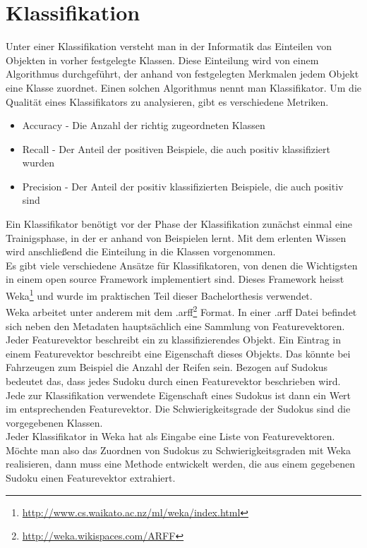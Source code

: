 \section{Klassifikation}
\label{Klassifikation}
Unter einer Klassifikation versteht man in der Informatik das Einteilen von Objekten in vorher festgelegte Klassen. Diese Einteilung wird von einem Algorithmus durchgeführt, der anhand von festgelegten Merkmalen jedem Objekt eine Klasse zuordnet. Einen solchen Algorithmus nennt man Klassifikator. Um die Qualität eines Klassifikators zu analysieren, gibt es verschiedene Metriken.
\begin{itemize}
\item Accuracy - Die Anzahl der richtig zugeordneten Klassen
\item Recall - Der Anteil der positiven Beispiele, die auch positiv klassifiziert wurden
\item Precision - Der Anteil der positiv klassifizierten Beispiele, die auch positiv sind
\end{itemize}
Ein Klassifikator benötigt vor der Phase der Klassifikation zunächst einmal eine Trainigsphase, in der er anhand von Beispielen lernt. Mit dem erlenten Wissen wird anschließend die Einteilung in die Klassen vorgenommen.\\
Es gibt viele verschiedene Ansätze für Klassifikatoren, von denen die Wichtigsten in einem open source Framework implementiert sind. Dieses Framework heisst Weka\footnote{\url{http://www.cs.waikato.ac.nz/ml/weka/index.html}} und wurde im praktischen Teil dieser Bachelorthesis verwendet.\\
Weka arbeitet unter anderem mit dem .arff\footnote{\url{http://weka.wikispaces.com/ARFF}} Format. In einer .arff Datei befindet sich neben den Metadaten hauptsächlich eine Sammlung von Featurevektoren. Jeder Featurevektor beschreibt ein zu klassifizierendes Objekt. Ein Eintrag in einem Featurevektor beschreibt eine Eigenschaft dieses Objekts. Das könnte bei Fahrzeugen zum Beispiel die Anzahl der Reifen sein. Bezogen auf Sudokus bedeutet das, dass jedes Sudoku durch einen Featurevektor beschrieben wird. Jede zur Klassifikation verwendete Eigenschaft eines Sudokus ist dann ein Wert im entsprechenden Featurevektor. Die Schwierigkeitsgrade der Sudokus sind die vorgegebenen Klassen.\\
Jeder Klassifikator in Weka hat als Eingabe eine Liste von Featurevektoren. Möchte man also das Zuordnen von Sudokus zu Schwierigkeitsgraden mit Weka realisieren, dann muss eine Methode entwickelt werden, die aus einem gegebenen Sudoku einen Featurevektor extrahiert.\\
